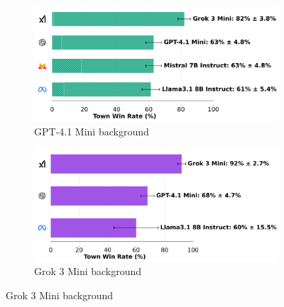 \documentclass{article}
\begin{document}
\begin{figure}[htbp]
    \centering
    \begin{subfigure}[b]{0.48\textwidth}
        \centering
        \includegraphics[width=\textwidth]{../results/villager_gpt-4.1_mini_v4_1_benchmark.png}
        \caption{GPT-4.1 Mini background}
        \label{fig:villager_gpt41mini}
    \end{subfigure}
    \hfill
    \begin{subfigure}[b]{0.48\textwidth}
        \centering
        \includegraphics[width=\textwidth]{../results/villager_grok_3_mini_v4_1_benchmark.png}
        \caption{Grok 3 Mini background}
        \label{fig:villager_grok3}
    \end{subfigure}
    
    \vspace{0.5cm}
    

\end{figure}
\end{document}
